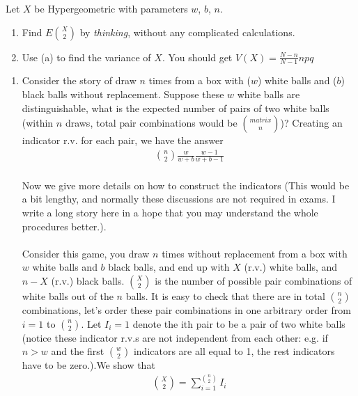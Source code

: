 
\setcounter{theorem}{47}
\begin{exercise} [BH.4.48] Let $X$ be Hypergeometric with parameters $w$, $b$, $n$.
	\begin{enumerate}
		\item Find $E\binom{X}{2}$ by \emph{thinking}, without any complicated calculations.
		\item Use (a) to find the variance of $X$. You should get $V(X) = \frac{N - n}{N - 1} npq$
	\end{enumerate}
\begin{solution}\begin{enumerate}
    \item Consider the story of draw $n$ times from a box with ($w$) white  balls and ($b$) black balls without replacement. Suppose these $w$ white balls are distinguishable, what is the expected number of pairs of two white balls (within $n$ draws, total pair combinations would be $\binom{matrix}{n}$)? Creating an indicator r.v. for each pair, we have the answer 
    \begin{align*}
        \binom{n}{2}\frac{w}{w+b}\frac{w-1}{w+b-1}
    \end{align*}
    ~\\ Now we give more details on how to construct the indicators (This would be a bit lengthy, and normally these discussions are not required in exams. I write a long story here in a hope that you may understand the whole procedures better.). \\~\\
    Consider this game, you draw $n$ times without replacement from a box with $w$ white balls and $b$ black balls, and end up with $X$ (r.v.) white balls, and $n-X$ (r.v.) black balls. $\binom{X}{2}$ is the number of possible pair combinations of white balls out of the $n$ balls. It is easy to check that there are in total $\binom{n}{2}$ combinations, let's order these pair combinations in one arbitrary order from $i=1$ to $\binom{n}{2}$.  Let $I_i=1$ denote the ith pair to be a pair of two white balls (notice these indicator r.v.s are not independent from each other: e.g. if $n>w$ and the first $\binom{w}{2}$ indicators are all equal to 1, the rest indicators have to be zero.).We show that 
    \begin{align}
    \binom{X}{2} = \sum_{i=1}^{\binom{n}{2}} I_i \label{1}
    \end{align}

\end{enumerate}
\end{solution}
\end{exercise}
